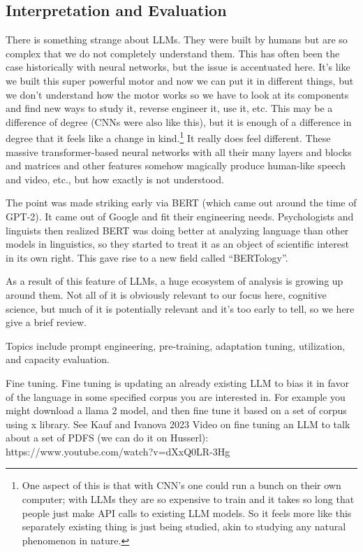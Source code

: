 \subsection{Interpretation and Evaluation}

There is something strange about LLMs.  They were built by humans but are so complex that we do not completely understand them. This has often been the case historically with neural networks, but the issue is accentuated here. It's like we built this super powerful motor and now we can put it in different things, but we don't understand how the motor works so we have to look at its components and find new ways to study it, reverse engineer it, use it, etc. This may be a difference of degree (CNNs were also like this), but it is enough of a difference in degree that it feels like a change in kind.\footnote{One aspect of this is that with CNN's one could run a bunch on their own computer; with LLMs they are so expensive to train and it takes so long that people just make API calls to existing LLM models. So it feels more like this separately existing thing is just being studied, akin to studying any natural phenomenon in nature.} It really does feel different. These massive transformer-based neural networks with all their many layers and blocks and matrices and other features somehow magically produce human-like speech and video, etc., but how exactly is not understood. 

The point was made striking early via BERT (which came out around the time of GPT-2). It came out of Google and fit their engineering needs. Psychologists and linguists then realized  BERT was doing better at analyzing language than other models in linguistics, so they started to treat it as an object of scientific interest in its own right. This gave rise to a new field called ``BERTology''. 

As a result of this feature of LLMs, a huge ecosystem of analysis is growing up around them. Not all of it is obviously relevant to our focus here, cognitive science, but much of it is potentially relevant and it's too early to tell, so we here give a brief review.

Topics  include prompt engineering, pre-training, adaptation tuning, utilization, and capacity evaluation.

 Fine tuning. Fine tuning is updating an already existing LLM to bias it in favor of the language in some specified corpus you are interested in. For example you might download a llama 2 model, and then fine tune it based on a set of corpus using x library.  See Kauf and Ivanova 2023
 Video on fine tuning an LLM to talk about a set of PDFS (we can do it on Husserl): https://www.youtube.com/watch?v=dXxQ0LR-3Hg


